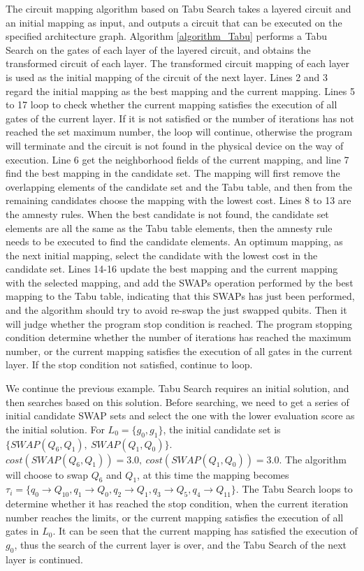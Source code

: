 \documentclass[runningheads]{llncs}
\begin{document}
The circuit mapping algorithm based on Tabu Search takes a layered circuit and an initial mapping as input, 
and outputs a circuit that can be executed on the specified architecture graph.
Algorithm \ref{algorithm_Tabu} performs a Tabu Search on the gates of each layer of the layered circuit, 
and obtains the transformed circuit of each layer. 
The transformed circuit mapping of each layer is used as the initial mapping of the circuit of the next layer.
Lines 2 and 3 regard the initial mapping as the best mapping and the current mapping.
Lines 5 to 17 loop to check whether the current mapping satisfies the execution of all gates of the current layer. 
If it is not satisfied or the number of iterations has not reached the set maximum number, 
the loop will continue, otherwise the program will terminate and the circuit is not found in the physical device 
on the way of execution.
Line 6  get the neighborhood fields of the current mapping, 
and line 7  find the best mapping in the candidate set. 
The mapping will first remove the overlapping elements of the candidate set and the Tabu table, 
and then from the remaining candidates choose the mapping  with the lowest cost.
Lines 8 to 13 are the amnesty rules. When the best candidate is not found, 
the candidate set elements are all the same as the Tabu table elements, 
then the amnesty rule needs to be executed to find the candidate elements.
An optimum mapping, as the next initial mapping,  select the candidate 
with the lowest cost in the candidate set.
Lines 14-16  update the best mapping and the current mapping with the selected mapping, 
and add the SWAPs operation performed by the best mapping to the Tabu table, 
indicating that this SWAPs has just been performed, 
and the algorithm should try to avoid re-swap the just swapped qubits. 
Then it will judge whether the program stop condition is reached. 
The program stopping condition  determine whether the number of iterations 
has reached the maximum number, or the current mapping satisfies the execution of 
all gates in the current layer. If the stop condition not satisfied, continue to loop.
\begin{example}
We continue the previous example. Tabu Search requires an initial solution, 
and then searches based on this solution. 
Before searching, we need to get a series of initial candidate SWAP sets
and select the one with the lower evaluation score as the initial solution.
For $L_{0}=\{g_{0},g_{1}\}$, the initial candidate set is $\{SWAP(Q_{6},Q_{1}),\ SWAP(Q_{1},Q_{0}) \}$.
$cost(SWAP(Q_{6},Q_{1}))=3.0,\ cost(SWAP(Q_{1},Q_{0}))=3.0$.
The algorithm will choose to swap $Q_{6}$ and $Q_{1}$, 
at this time the mapping becomes $\tau_{i}=\{q_{0}\rightarrow  Q_{10},q_{1}\rightarrow  Q_{0},
q_{2}\rightarrow  Q_{1},q_{3}\rightarrow  Q_{5},q_{4}\rightarrow  Q_{11}\}$. 
The Tabu Search loops to determine whether it has reached the stop condition,
when the current iteration number reaches the limits, 
or the current mapping satisfies the execution of all gates in $L_{0}$.
It can be seen that the current mapping has satisfied the execution of $g_{0}$, 
thus the search of the current layer is over, and the Tabu Search of the next layer is continued.
\end{example}
\end{document}
